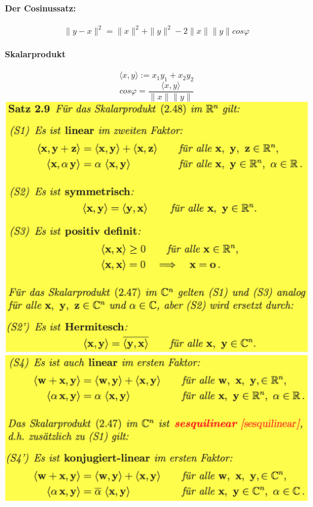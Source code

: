 \documentclass[11pt]{article}
\newcommand\back[1][-3cm]{\hspace*{#1}}
\begin{document}
\paragraph{Der Cosinussatz:}
\begin{equation}
	\parallel y-x\parallel^2=\parallel x\parallel^2+\parallel y\parallel^2-2\parallel x\parallel\parallel y\parallel cos\varphi
\end{equation}
\paragraph{Skalarprodukt}
\begin{equation}
	\langle x,y\rangle := x_1y_1+x_2y_2
\end{equation}
\begin{equation}
	cos\varphi = \frac{\langle x,y\rangle}{\parallel x\parallel\parallel y\parallel}
\end{equation}
\back\includegraphics{images/skalarprodukt}\\
\back\includegraphics{images/skal}\\
\end{document}
